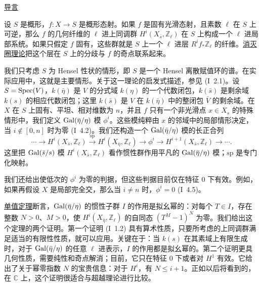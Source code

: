 {}
\thispagestyle{empty}
\begin{center}
\underline{导言}
\end{center}

设 $S$ 是概形，$f:X\longrightarrow S$ 是概形态射。如果 $f$ 是固有光滑态射，且素数 $\ell$ 在 $S$ 上可逆，那么 $f$ 的几何纤维的 $\ell$ 进上同调群 $H^i(X_{\bar s},\mathbb Z_\ell)$ 在 $S$ 上构成一个 $\ell$ 进局部系统。如果只假定 $f$ 固有，这些群就是 $S$ 上一个 $\ell$ 进层 $R^if_*\mathbb Z_\ell$ 的纤维。\underline{消灭圈理论}把这个层在 $S$ 上的分歧与 $f$ 的奇点联系起来。

我们只考虑 $S$ 为 Hensel 性状的情形，即 $S$ 是一个 Hensel 离散赋值环的谱。在实际应用中，这就是主要情形。关于这一理论的启发式描述，参见 (I~2.1)。设 $S=\operatorname{Spec}(V)$，$k(\bar\eta)$ 是 $V$ 的分式域 $k(\eta)$ 的一个代数闭包，$k(\bar s)$ 是剩余域 $k(s)$ 的相应代数闭包；这里 $k(\bar s)$ 是 $V$ 在 $k(\bar\eta)$ 中的整闭包 $\bar V$ 的剩余域。在 $X$ 在 $S$ 上固有、平坦、相对维数为 $n$，并且 $f$ 只有一个非光滑点 $x\in X_s$ 的特殊情形中，我们定义 $\operatorname{Gal}(\bar\eta/\eta)$ 模 $\phi^i$。这些模纯粹由 $x$ 的邻域中的局部情形决定，当 $i\notin[0,n]$ 时为零 (I~4.2)。我们还构造一个 $\operatorname{Gal}(\bar\eta/\eta)$ 模的长正合列
\[
\cdots\longrightarrow H^i(X_{\bar s},\mathbb Z_\ell)
\xrightarrow{\mathrm{sp}}H^i(X_{\bar\eta},\mathbb Z_\ell)
\longrightarrow\phi^i\longrightarrow
H^{i+1}(X_{\bar s},\mathbb Z_\ell)\longrightarrow\cdots.
\]
这里把 $\operatorname{Gal}(\bar s/s)$ 模 $H^i(X_{\bar s},\mathbb Z_\ell)$ 看作惯性群作用平凡的 $\operatorname{Gal}(\bar\eta/\eta)$ 模；$\mathrm{sp}$ 是专门化映射。

我们还给出使低次的 $\phi^i$ 为零的判据，但这些判据目前仅在特征 $0$ 下有效。例如，如果再假设 $X$ 是局部完全交，那么当 $i\ne n$ 时，$\phi^i=0$ (I~4.5)。

\clearpage
\underline{单值定理}断言，$\operatorname{Gal}(\bar\eta/\eta)$ 的惯性子群 $I$ 的作用是拟幺幂的：对每个 $T\in I$，存在整数 $N>0$、$M>0$，使 $H^i(X_{\bar\eta},\mathbb Z_\ell)$ 的自同态 $(T^M-1)^N$ 为零。我们给出这个定理的两个证明。第一个证明 (I~1.2) 具有算术性质，只要所考虑的上同调群满足适当的有限性性质，就可以应用。关键在于：当 $k(s)$ 在其素域上有限生成时，对于 $\operatorname{Gal}(\bar\eta/\eta)$ 的任意 $\ell$ 进表示，$I$ 的作用都是拟幺幂的。第二个证明更具几何性质，需要纯性和奇点解消；目前，它只在特征 $0$ 下或者对 $H^1$ 有效。它给出了关于幂零指数 $N$ 的宝贵信息：对于 $H^i$，有 $N\leq i+1$。正如以后将看到的，在 $\mathbb C$ 上，这个证明很适合与超越理论进行比较。

